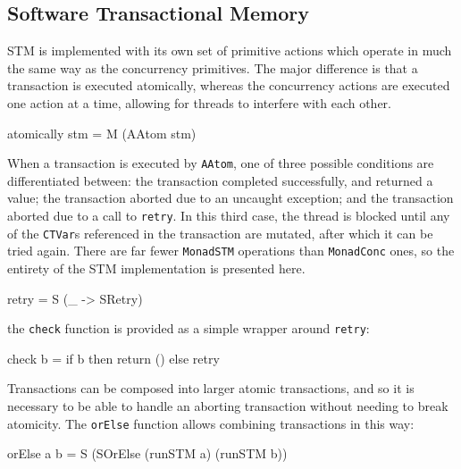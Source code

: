 \subsection{Software Transactional Memory}
\label{sec:execution-primops-stm}

STM is implemented with its own set of primitive actions which operate
in much the same way as the concurrency primitives. The major
difference is that a transaction is executed atomically, whereas the
concurrency actions are executed one action at a time, allowing for
threads to interfere with each other.

\begin{haskellcode}
atomically stm = M (AAtom stm)
\end{haskellcode}


When a transaction is executed by \verb|AAtom|, one of three possible
conditions are differentiated between: the transaction completed
successfully, and returned a value; the transaction aborted due to an
uncaught exception; and the transaction aborted due to a call to
\verb|retry|. In this third case, the thread is blocked until any of
the \verb|CTVar|s referenced in the transaction are mutated, after
which it can be tried again. There are far fewer \verb|MonadSTM|
operations than \verb|MonadConc| ones, so the entirety of the STM
implementation is presented here.

\begin{haskellcode}
retry = S (\_ -> SRetry)
\end{haskellcode}


the \verb|check| function is provided as a simple wrapper around
\verb|retry|:

\begin{haskellcode}
check b = if b then return () else retry
\end{haskellcode}

Transactions can be composed into larger atomic transactions, and so
it is necessary to be able to handle an aborting transaction without
needing to break atomicity. The \verb|orElse| function allows
combining transactions in this way:

\begin{haskellcode}
orElse a b = S (SOrElse (runSTM a) (runSTM b))
\end{haskellcode}

